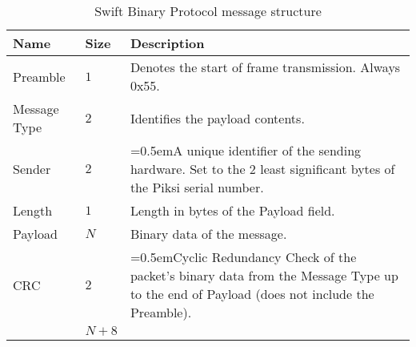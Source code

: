 \documentclass{article}
\numberwithin{table}{subsection}
\numberwithin{field}{subsection}
\begin{document}
\begin{table}[h]
  \centering
  \begin{tabularx}{\textwidth}{aaX}
    \toprule
    Name & Size & Description \\
    \midrule
    {Preamble} & $1$ & Denotes the start of frame transmission. Always 0x55. \\
    {Message Type} & $2$ & Identifies the payload contents. \\
    {Sender} & $2$ & \hangindent=0.5em{A unique identifier of the sending hardware. Set to the 2 least significant bytes of the Piksi serial number.} \\
    {Length} & $1$ & Length in bytes of the {Payload} field. \\
    {Payload} & $N$ & Binary data of the message. \\
    {CRC} & $2$ & \hangindent=0.5em{Cyclic Redundancy Check of the packet's binary data from the Message Type up to the end of Payload (does not include the Preamble).} \\
    \midrule
    & $N+8$ \\
    \bottomrule
  \end{tabularx}
  \caption{Swift Binary Protocol message structure}
  \label{tab:message}
\end{table}
\newpage
\end{document}
